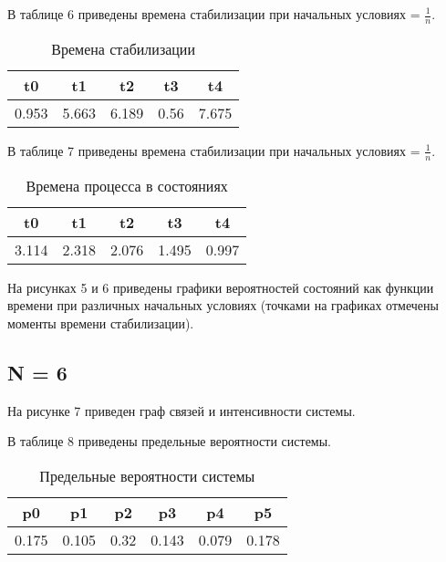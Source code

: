 В таблице 6 приведены времена стабилизации при начальных условиях = $\frac{1}{n}$.
\begin{table}[h!]
	\centering
	\caption{Времена стабилизации}
	\begin{tabular}{|c c c c c|} 
		\hline
		t0 & t1 & t2  & t3 & t4 \\ [0.5ex] 
		\hline
		0.953 & 5.663 & 6.189 & 0.56 & 7.675 \\ [0.5ex] 
		\hline
	\end{tabular}
\end{table}

В таблице 7 приведены времена стабилизации при начальных условиях = $\frac{1}{n}$.
\begin{table}[h!]
	\centering
	\caption{Времена процесса в состояниях}
	\begin{tabular}{|c c c c c|} 
		\hline
		t0 & t1 & t2  & t3 & t4 \\ [0.5ex] 
		\hline
		3.114 & 2.318 & 2.076 & 1.495 & 0.997 \\ [0.5ex] 
		\hline
	\end{tabular}
\end{table}

На рисунках 5 и 6 приведены графики вероятностей состояний как функции времени при различных начальных условиях (точками на графиках отмечены моменты времени стабилизации).




\subsection*{N = 6}
На рисунке 7 приведен граф связей и интенсивности системы.

В таблице 8 приведены предельные вероятности системы.
\begin{table}[h!]
	\centering
	\caption{Предельные вероятности системы}
	\begin{tabular}{|c c c c c c|} 
		\hline
		p0 & p1 & p2  & p3 & p4 & p5  \\ [0.5ex] 
		\hline
		0.175 & 0.105 & 0.32 & 0.143 & 0.079 & 0.178 \\ [0.5ex] 
		\hline
	\end{tabular}
\end{table}

